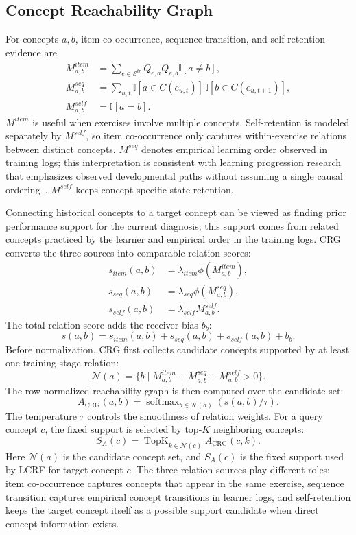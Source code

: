 \documentclass[conference]{IEEEtran}
\begin{document}
\subsection{Concept Reachability Graph}
For concepts \(a,b\), item co-occurrence, sequence transition, and self-retention evidence are
\[
\begin{aligned}
M^{item}_{a,b}
&=\sum_{e\in \mathcal{E}^{tr}} Q_{e,a}Q_{e,b}\mathbb{I}[a\neq b],\\
M^{seq}_{a,b}
&=\sum_{u,t}
\mathbb{I}[a\in C(e_{u,t})]\,
\mathbb{I}[b\in C(e_{u,t+1})],\\
M^{self}_{a,b}
&=\mathbb{I}[a=b].
\end{aligned}
\]
\(M^{item}\) is useful when exercises involve multiple concepts. Self-retention is modeled separately by \(M^{self}\), so item co-occurrence only captures within-exercise relations between distinct concepts. \(M^{seq}\) denotes empirical learning order observed in training logs; this interpretation is consistent with learning progression research that emphasizes observed developmental paths without assuming a single causal ordering~\cite{corcoran2009learning}. \(M^{self}\) keeps concept-specific state retention.

Connecting historical concepts to a target concept can be viewed as finding prior performance support for the current diagnosis; this support comes from related concepts practiced by the learner and empirical order in the training logs. CRG converts the three sources into comparable relation scores:
\[
\begin{aligned}
s_{item}(a,b)&=\lambda_{item}\phi(M^{item}_{a,b}),\\
s_{seq}(a,b)&=\lambda_{seq}\phi(M^{seq}_{a,b}),\\
s_{self}(a,b)&=\lambda_{self}M^{self}_{a,b}.
\end{aligned}
\]
The total relation score adds the receiver bias \(b_b\):
\[
s(a,b)=s_{item}(a,b)+s_{seq}(a,b)+s_{self}(a,b)+b_b .
\]
Before normalization, CRG first collects candidate concepts supported by at least one training-stage relation:
\[
\mathcal{N}(a)
=
\{b\mid
M^{item}_{a,b}
+M^{seq}_{a,b}
+M^{self}_{a,b}>0
\}.
\]
The row-normalized reachability graph is then computed over the candidate set:
\[
A_{\mathrm{CRG}}(a,b)
=
\operatorname{softmax}_{b\in \mathcal{N}(a)}
\left(s(a,b)/\tau\right).
\]
The temperature \(\tau\) controls the smoothness of relation weights. For a query concept \(c\), the fixed support is selected by top-\(K\) neighboring concepts:
\[
S_A(c)=
\operatorname{TopK}_{k\in \mathcal{N}(c)}
A_{\mathrm{CRG}}(c,k).
\]
Here \(\mathcal{N}(a)\) is the candidate concept set, and \(S_A(c)\) is the fixed support used by LCRF for target concept \(c\). The three relation sources play different roles: item co-occurrence captures concepts that appear in the same exercise, sequence transition captures empirical concept transitions in learner logs, and self-retention keeps the target concept itself as a possible support candidate when direct concept information exists.
\end{document}
